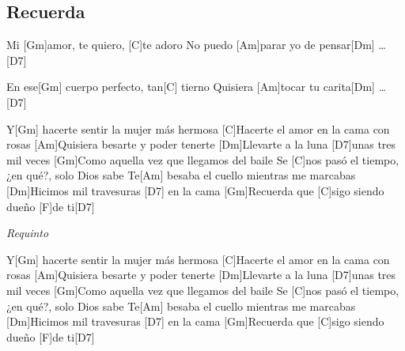 \subsection{Recuerda}

\noindent
\vspace{1cm}

\begin{guitar}
	\begin{multicols}{2}

		Mi [Gm]amor, te quiero, [C]te adoro
		No puedo [Am]parar yo de pensar[Dm] \dots [D7] \par
		En ese[Gm] cuerpo perfecto, tan[C] tierno
		Quisiera [Am]tocar tu carita[Dm] \dots [D7] \par
		Y[Gm] hacerte sentir la mujer más hermosa
		[C]Hacerte el amor en la cama con rosas
		[Am]Quisiera besarte y poder tenerte
		[Dm]Llevarte a la luna [D7]unas tres mil veces
		[Gm]Como aquella vez que llegamos del baile
		Se [C]nos pasó el tiempo, ¿en qué?, solo Dios sabe
		Te[Am] besaba el cuello mientras me marcabas
		[Dm]Hicimos mil travesuras [D7] en la cama
		[Gm]Recuerda que [C]sigo siendo dueño [F]de ti[D7] \par
		\par
		\textit{Requinto}
		\par
		Y[Gm] hacerte sentir la mujer más hermosa
		[C]Hacerte el amor en la cama con rosas
		[Am]Quisiera besarte y poder tenerte
		[Dm]Llevarte a la luna [D7]unas tres mil veces
		[Gm]Como aquella vez que llegamos del baile
		Se [C]nos pasó el tiempo, ¿en qué?, solo Dios sabe
		Te[Am] besaba el cuello mientras me marcabas
		[Dm]Hicimos mil travesuras [D7] en la cama
		[Gm]Recuerda que [C]sigo siendo dueño [F]de ti[D7] \par
	
	\end{multicols}
\end{guitar}
